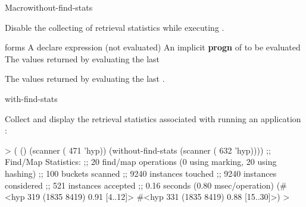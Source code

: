 \documentclass[10pt,twoside,english,pdftex]{article}
\begin{document}

\begin{functiondoc}{Macro}{without-find-stats}%
  {\superstar{}
    \superstar{}
    \returns{} \superstar} 
%
%
%
  
\fnsyntax

\fnpurpose 
{}%
%
Disable the collecting of retrieval statistics while executing .

\fnpackage {}

\fnmodule {}

\fnargs
\begin{args}{forms}
\arg[declaration] A declare expression (not evaluated)
\arg[forms] An implicit \textbf{progn} of  to be evaluated
\arg[results] The values returned by evaluating the last 
\end{args}

\fnreturns The values returned by evaluating the last .

\begin{alsos}{with-find-stats}
\end{alsos}

\fnexample
{}%
%
Collect and display the retrieval statistics associated with
running an application  :
%
\W\supp
\begin{example}
> ( ()
     (scanner ( 471 'hyp))
     (without-find-stats
        (scanner ( 632 'hyp))))
  ;; Find/Map Statistics:
  ;;        20 find/map operations (0 using marking, 20 using hashing)
  ;;       100 buckets scanned
  ;;      9240 instances touched
  ;;      9240 instances considered
  ;;       521 instances accepted
  ;;      0.16 seconds (0.80 msec/operation)
  (#<hyp 319 (1835 8419) 0.91 [4..12]>
   #<hyp 331 (1835 8419) 0.88 [15..30]>)
  >
\end{example}

\end{functiondoc}

\end{document}
